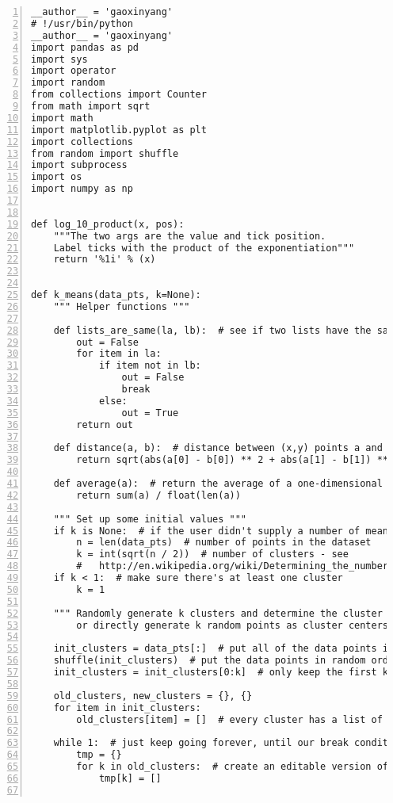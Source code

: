\begin{lstlisting}[numbers=left, breaklines=true]
__author__ = 'gaoxinyang'
# !/usr/bin/python
__author__ = 'gaoxinyang'
import pandas as pd
import sys
import operator
import random
from collections import Counter
from math import sqrt
import math
import matplotlib.pyplot as plt
import collections
from random import shuffle
import subprocess
import os
import numpy as np


def log_10_product(x, pos):
    """The two args are the value and tick position.
    Label ticks with the product of the exponentiation"""
    return '%1i' % (x)


def k_means(data_pts, k=None):
    """ Helper functions """

    def lists_are_same(la, lb):  # see if two lists have the same elements
        out = False
        for item in la:
            if item not in lb:
                out = False
                break
            else:
                out = True
        return out

    def distance(a, b):  # distance between (x,y) points a and b
        return sqrt(abs(a[0] - b[0]) ** 2 + abs(a[1] - b[1]) ** 2)

    def average(a):  # return the average of a one-dimensional list (e.g., [1, 2, 3])
        return sum(a) / float(len(a))

    """ Set up some initial values """
    if k is None:  # if the user didn't supply a number of means to look for, try to estimate how many there are
        n = len(data_pts)  # number of points in the dataset
        k = int(sqrt(n / 2))  # number of clusters - see
        #   http://en.wikipedia.org/wiki/Determining_the_number_of_clusters_in_a_data_set#Rule_of_thumb
    if k < 1:  # make sure there's at least one cluster
        k = 1

    """ Randomly generate k clusters and determine the cluster centers,
        or directly generate k random points as cluster centers. """

    init_clusters = data_pts[:]  # put all of the data points into clusters
    shuffle(init_clusters)  # put the data points in random order
    init_clusters = init_clusters[0:k]  # only keep the first k random clusters

    old_clusters, new_clusters = {}, {}
    for item in init_clusters:
        old_clusters[item] = []  # every cluster has a list of points associated with it. Initially, it's 0

    while 1:  # just keep going forever, until our break condition is met
        tmp = {}
        for k in old_clusters:  # create an editable version of the old_clusters dictionary
            tmp[k] = []


\end{lstlisting}

